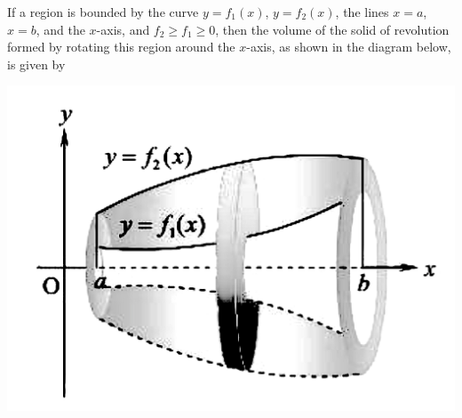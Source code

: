    If a region is bounded by the curve $y = f_1(x)$, $y = f_2(x)$, the lines $x =
a$, $x = b$, and the $x$-axis, and $f_2 \geq f_1 \geq 0$, then the volume of
    the solid of revolution formed by rotating this region around the $x$-axis, as
    shown in the diagram below, is given by
    \begin{center}
    \end{center}
    \begin{center}
        \includegraphics[scale=0.15]{assets/28-29.png}
    \end{center}


